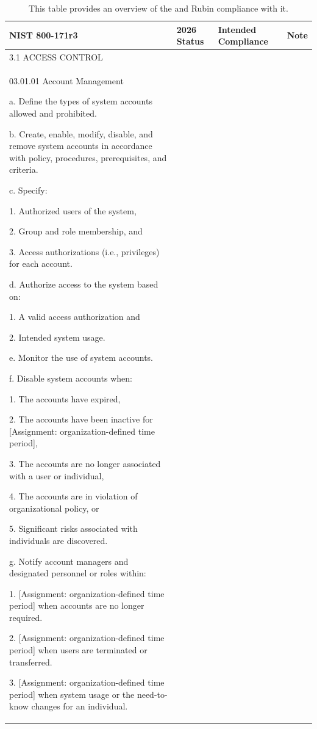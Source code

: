 \tiny \begin{longtable} {|p{}|p{}|p{}|p{} |} \caption{This table provides an overview of the  and Rubin compliance with it. \label{tab:compliance}}\\
\hline
\textbf{NIST 800-171r3}&\textbf{2026 Status}&\textbf{Intended Compliance}&\textbf{Note} \\ \hline
{3.1 ACCESS CONTROL}&&& \\ \hline
{03.01.01 Account Management

a. Define the types of system accounts allowed and prohibited.

b. Create, enable, modify, disable, and remove system accounts in accordance with policy, procedures, prerequisites, and criteria.

c. Specify:

1. Authorized users of the system,

2. Group and role membership, and

3. Access authorizations (i.e., privileges) for each account.

d. Authorize access to the system based on:

1. A valid access authorization and

2. Intended system usage.

e. Monitor the use of system accounts.

f. Disable system accounts when:

1. The accounts have expired,

2. The accounts have been inactive for [Assignment: organization-defined time period],

3. The accounts are no longer associated with a user or individual,

4. The accounts are in violation of organizational policy, or

5. Significant risks associated with individuals are discovered.

g. Notify account managers and designated personnel or roles within:

1. [Assignment: organization-defined time period] when accounts are no longer required.

2. [Assignment: organization-defined time period] when users are terminated or transferred.

3. [Assignment: organization-defined time period] when system usage or the need-to-know changes for an individual.

}
\end{longtable}
